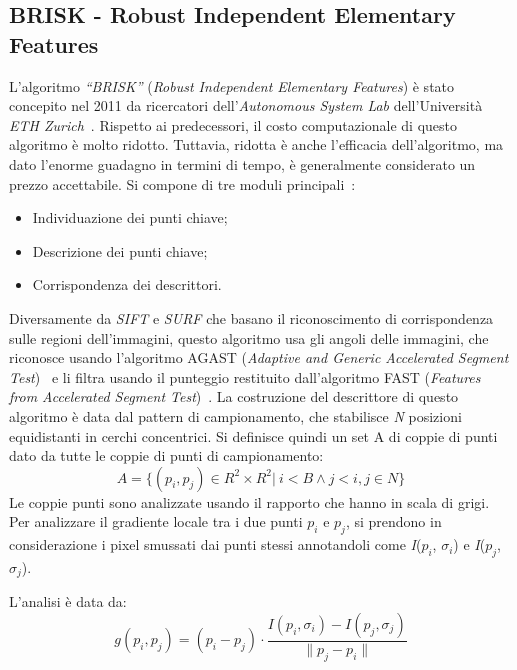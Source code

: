 \subsection{BRISK - Robust Independent Elementary Features}
L'algoritmo \textit{``BRISK''} (\textit{Robust Independent Elementary Features}) è stato concepito nel 2011 da ricercatori dell'\textit{Autonomous System Lab} dell'Università \textit{ETH Zurich}~\cite{6126542}. Rispetto ai predecessori, il costo computazionale di questo algoritmo è molto ridotto. Tuttavia, ridotta è anche l'efficacia dell'algoritmo, ma dato l'enorme guadagno in termini di tempo, è generalmente considerato un prezzo accettabile.
\noindent Si compone di tre moduli principali~\cite{Liu2018-ds}: 
\begin{itemize}
	\item Individuazione dei punti chiave;
	\item Descrizione dei punti chiave; 
	\item Corrispondenza dei descrittori.
\end{itemize}
\noindent Diversamente da \textit{SIFT} e \textit{SURF} che basano il riconoscimento di corrispondenza sulle regioni dell'immagini, questo algoritmo usa gli angoli delle immagini, che riconosce usando l'algoritmo AGAST (\textit{Adaptive and Generic Accelerated Segment Test})~\cite{10.1007/978-3-642-15552-9_14} e li filtra usando il punteggio restituito dall'algoritmo FAST (\textit{Features from Accelerated Segment Test})~\cite{Rosten2010-yf}. \hfill \break
\noindent La costruzione del descrittore di questo algoritmo è data dal pattern di campionamento, che stabilisce \textit{N} posizioni equidistanti in cerchi concentrici. Si definisce quindi un set A di coppie di punti dato da tutte le coppie di punti di campionamento:
\begin{equation}
	A = \{ (p_{i}, p_{j}) \in R^{2} \times R^{2} |\ i < B \wedge j < i, j \in \textit{N} \}
\end{equation}
\noindent Le coppie punti sono analizzate usando il rapporto che hanno in scala di grigi.
Per analizzare il gradiente locale tra i due punti \(p_{i}\) e \(p_{j}\), si prendono in considerazione i pixel smussati dai punti stessi annotandoli come \textit{I}(\(p_{i}\), \(\sigma_{i}\)) e \textit{I}(\(p_{j}\), \(\sigma_{j}\)). \par
\noindent L'analisi è data da:
\begin{equation}
	g(p_{i}, p_{j}) = (p_{i} - p_{j}) \cdot \frac{\textit{I}(p_{i}, \sigma_{i}) - \textit{I}(p_{j}, \sigma_{j})}{\|p_{j} - p_{i}\|}
\end{equation}
